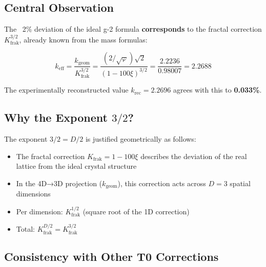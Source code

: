 	\subsection{Central Observation}
	
	The ~2\% deviation of the ideal g-2 formula \textbf{corresponds} to the fractal correction $K_\text{frak}^{3/2}$, already known from the mass formulas:
	
	\begin{equation}
		\boxed{k_\text{eff} = \frac{k_\text{geom}}{K_\text{frak}^{3/2}} = \frac{(2/\sqrt{\varphi})\sqrt{2}}{(1-100\xi)^{3/2}} = \frac{2.2236}{0.98007} = 2.2688}
	\end{equation}
	
	The experimentally reconstructed value $k_\text{rec} = 2.2696$ agrees with this to \textbf{0.033\%}.
	
	\subsection{Why the Exponent $3/2$?}
	
	The exponent $3/2 = D/2$ is justified geometrically as follows:
	\begin{itemize}
		\item The fractal correction $K_\text{frak} = 1 - 100\xi$ describes the deviation of the real lattice from the ideal crystal structure
		\item In the 4D→3D projection ($k_\text{geom}$), this correction acts across $D = 3$ spatial dimensions
		\item Per dimension: $K_\text{frak}^{1/2}$ (square root of the 1D correction)
		\item Total: $K_\text{frak}^{D/2} = K_\text{frak}^{3/2}$
	\end{itemize}
	
	\subsection{Consistency with Other T0 Corrections}
	
	\begin{table}[h]
		\centering
		\caption{Universal fractal correction with context-dependent exponent}
	\end{table}
	
